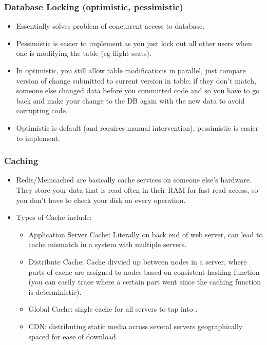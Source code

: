 \begin{frame}
	\frametitle{Database Locking (optimistic, pessimistic)}
		
			\begin{itemize}
				\item Essentially solves problem of concurrent access to database. 
				\item Pessimistic is easier to implement as 
you just lock out all other users when one is modifying the table (eg flight seats). 
				\item In optimistic, you 
still allow table modifications in parallel, just compare version of change submitted to current version in table; if they don’t match, someone else changed data before you committed code and 
so you have to go back and make your change to the DB again with the new data to avoid 
corrupting code. 
				\item Optimistic is default (and requires manual intervention), pessimistic is easier to 
implement. 
			\end{itemize}		
\end{frame}

\begin{frame}
	\frametitle{Caching}
		
			\begin{itemize}
				\item Redis/Memcached are basically cache services on someone else’s hardware. They store your data 
that is read often in their RAM for fast read access, so you don’t have to check your disk on every 
operation. 
				\item Types of Cache include:
			\begin{itemize}
				\item Application Server Cache: Literally on back end of web server, can lead to cache mismatch in a system with multiple servers. 
				\item Distribute Cache: Cache divvied up between nodes in a server, where parts of cache are assigned to 
nodes based on consistent hashing function (you can easily trace where a certain part went since 
the caching function is deterministic).
				\item Global Cache: single cache for all servers to tap into . 
				\item CDN: distributing static media across several servers geographically spaced for ease of 
download. 
			\end{itemize}		

			\end{itemize}		
\end{frame}

